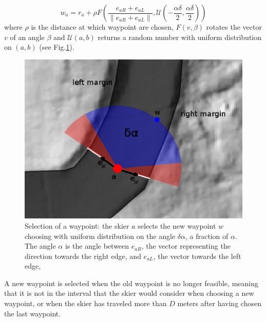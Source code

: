 \documentclass[12pt,a4paper,twoside]{book}
\newcommand{\norm}[1]{\lVert#1\rVert}
\begin{document}
\begin{equation}\label{new_waypoint}
w_a=r_a+\rho F\left(\frac{e_{aR}+e_{aL}}{\norm{e_{aR}+e_{aL}}},\mathcal{U}\left(-\frac{\alpha\delta}{2},\frac{\alpha\delta}{2}\right)\right)
\end{equation}
where $\rho$ is the distance at which waypoint are chosen, $F\left(v,\beta\right)$ rotates the vector $v$ of an angle $\beta$ and $\mathcal{U}(a,b)$ returns a random number with uniform distribution on $(a,b)$ (see Fig.\ref{new_waypoint_pic}).

\begin{figure}[!ht]
  \begin{center}
    \includegraphics[width=\textwidth]{images/waypoint_new.eps}
    \caption{Selection of a waypoint: the skier $a$ selects the new waypoint $w$ choosing with uniform distribution on the angle $\delta\alpha$, a fraction of $\alpha$. The angle $\alpha$ is the angle between $e_{aR}$, the vector representing the direction towards the right edge, and $e_{aL}$, the vector towards the left edge,}\label{new_waypoint_pic}
  \end{center}
\end{figure}

A new waypoint is selected when the old waypoint is no longer feasible, meaning that it is not in the interval that the skier would consider when choosing a new waypoint, or when the skier has traveled more than $D$ meters after having chosen the last waypoint.
\end{document}
